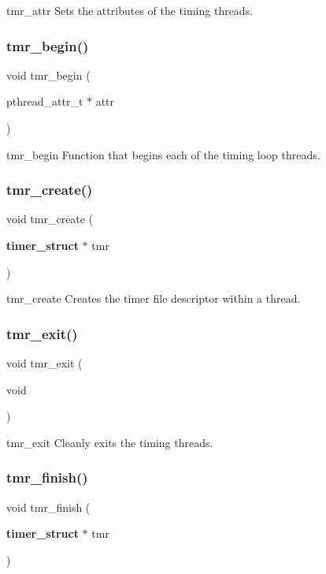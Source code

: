 tmr\+\_\+attr Sets the attributes of the timing threads. \mbox{\label{timer_8c_a4efd332e3afdcac5e4bb91be460ff510}} 
\subsubsection{tmr\+\_\+begin()}
{\footnotesize\ttfamily void tmr\+\_\+begin (\begin{DoxyParamCaption}\item[{pthread\+\_\+attr\+\_\+t $\ast$}]{attr }\end{DoxyParamCaption})}

tmr\+\_\+begin Function that begins each of the timing loop threads. \mbox{\label{timer_8c_a30ed299558ee3d16ca6e93fa84320427}} 
\subsubsection{tmr\+\_\+create()}
{\footnotesize\ttfamily void tmr\+\_\+create (\begin{DoxyParamCaption}\item[{\textbf{ timer\+\_\+struct} $\ast$}]{tmr }\end{DoxyParamCaption})}

tmr\+\_\+create Creates the timer file descriptor within a thread. \mbox{\label{timer_8c_a05acd3f7d242aaaeadba6bba4dbaad64}} 
\subsubsection{tmr\+\_\+exit()}
{\footnotesize\ttfamily void tmr\+\_\+exit (\begin{DoxyParamCaption}\item[{void}]{ }\end{DoxyParamCaption})}

tmr\+\_\+exit Cleanly exits the timing threads. \mbox{\label{timer_8c_ae824a7814ba064b1ce4d3a1d23016a43}} 
\subsubsection{tmr\+\_\+finish()}
{\footnotesize\ttfamily void tmr\+\_\+finish (\begin{DoxyParamCaption}\item[{\textbf{ timer\+\_\+struct} $\ast$}]{tmr }\end{DoxyParamCaption})}

